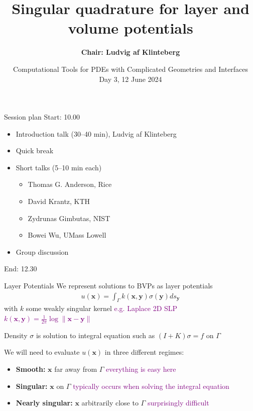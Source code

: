 \documentclass[t]{beamer}
\title{Singular quadrature for layer and volume potentials}
\date{Computational Tools for PDEs with Complicated Geometries and Interfaces\\
  Day 3, 12 June 2024}
\author{\textbf{Chair: Ludvig af Klinteberg}\inst{1}}
\institute{\inst{1} Mälardalen University (MDU), Västerås, Sweden}
\newcommand{\mbf}[1]{{\bm #1}}           %
\newcommand{\com}[1]{{\scriptsize \textcolor{purple}{#1}}}      %
\newcommand{\vg}{\vspace{2ex}}
\newcommand{\sg}{\vspace{1ex}}
\newcommand{\xx}{\mbf{x}}
\newcommand{\yy}{\mbf{y}}
\begin{document}
\begin{frame}
	\titlepage
\end{frame}

\begin{frame}[c]{Session plan}
  Start: 10.00
  \bigskip
  \begin{itemize}
  \item Introduction talk (30--40 min), Ludvig af Klinteberg
  \item Quick break
  \item Short talks (5--10 min each)
    \begin{itemize}
    \item Thomas G. Anderson, Rice
    \item David Krantz, KTH
    \item Zydrunas Gimbutas, NIST
    \item Bowei Wu, UMass Lowell
    \end{itemize}
  \item Group discussion
  \end{itemize}
  \bigskip  
  End: 12.30
\end{frame}

\begin{frame}{Layer Potentials}
  We represent solutions to BVPs as layer potentials
  \begin{align}
    u(\xx) = \int_\Gamma k(\xx, \yy) \sigma(\yy) ds_\yy
  \end{align}
  with $k$ some weakly singular kernel \com{e.g. Laplace 2D SLP $k(\xx,
    \yy) = \frac{1}{2\pi} \log\|\xx-\yy\|$}

  \sg
  Density $\sigma$ is solution to integral equation such as $(I+K)\sigma=f$ on $\Gamma$
  
  \vg
  We will need to evaluate $u(\xx)$ in three different regimes:
  \begin{itemize}
  \item \textbf{Smooth:} $\xx$ far away from $\Gamma$
    \hfill \com{everything is easy here}
  \item \textbf{Singular:} $\xx$ on $\Gamma$
    \hfill \com{typically occurs when solving the integral equation}
  \item \textbf{Nearly singular:} $\xx$ arbitrarily close to $\Gamma$
    \hfill \com{surprisingly difficult}
  \end{itemize}
\end{frame}
\end{document}
